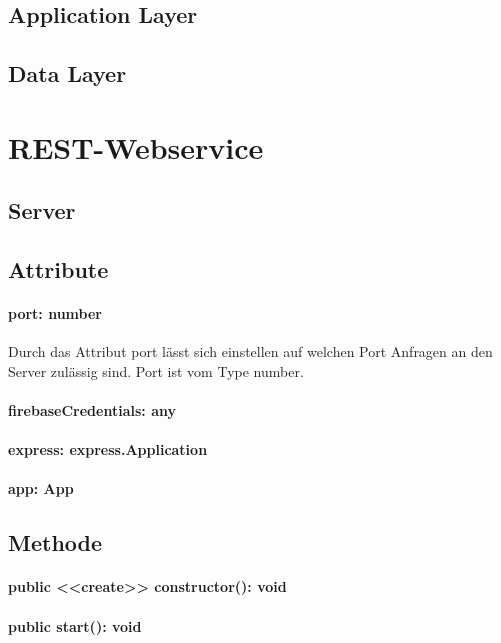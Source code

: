 \documentclass[parskip=full]{scrartcl}
\begin{document}
\newpage


\subsection{Application Layer}
\subsection{Data Layer}

\section{REST-Webservice}

\subsection{Server}
\subsection*{Attribute}
\paragraph{port: number} Durch das Attribut port lässt sich einstellen auf welchen Port Anfragen an den Server zulässig sind.
Port ist vom Type number.
\paragraph{firebaseCredentials: any}
\paragraph{express: express.Application}
\paragraph{app: App}
\paragraph{}

\subsection*{Methode}
\paragraph{public <<create>> constructor(): void}
\paragraph{public start(): void}
\end{document}
